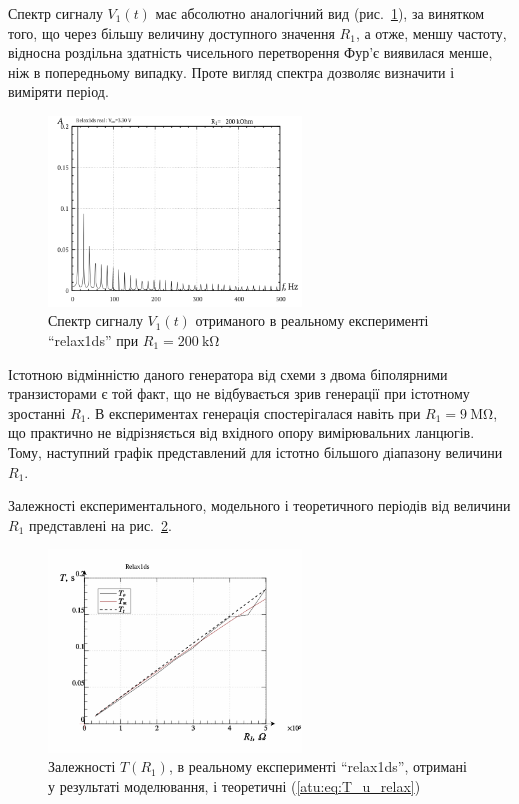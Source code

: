Спектр сигналу
$V_1(t) $ має абсолютно аналогічний вид (рис.~\ref{atu:f:relax1ds_f_r1}), за
винятком того, що через більшу величину доступного значення
$R_1$, а отже, меншу частоту, відносна роздільна здатність
чисельного перетворення Фур'є виявилася менше, ніж в
попередньому випадку. Проте вигляд спектра дозволяє визначити
і виміряти період.

\begin{figure}[htb!]
  \centerline{\includegraphics[width=0.6\textwidth]{p/relax1ds_f_200000.png} }
\caption{Спектр сигналу $V_1(t)$ отриманого в реальному експерименті ``relax1ds'' при $ R_1 = \SI{200}{\kilo \ohm} $}
  \label{atu:f:relax1ds_f_r1}
\end{figure}

Істотною відмінністю даного генератора від схеми з двома
біполярними транзисторами є той факт, що не відбувається зрив
генерації при істотному зростанні
$R_1$. В експериментах генерація спостерігалася навіть при
$R_1 = \SI{9}{\mega \ohm} $, що практично не відрізняється від вхідного
опору вимірювальних ланцюгів. Тому, наступний графік
представлений для істотно більшого діапазону величини
$R_1$.

Залежності експериментального, модельного і теоретичного періодів
від величини
$R_1$ представлені на рис.~\ref{atu:f:relax1ds_read_cmp-p_R1_T}.


\begin{figure}[htb!]
  \centerline{\includegraphics[width=0.6\textwidth]{p/relax1ds_read_cmp-p_R1_T.png} }
\caption{Залежності $T(R_1)$, в реальному експерименті ``relax1ds'', отримані у результаті моделювання, і теоретичні (\ref{atu:eq:T_u_relax})}
\label{atu:f:relax1ds_read_cmp-p_R1_T}
\end{figure}

